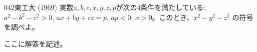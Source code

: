 \begin{thm}{042}{}{東工大 (1969)}
 実数$a,b,c,x,y,z,p$が次の4条件を満たしている: $a^2-b^2-c^2>0$, $ax+by+cz=p$, $ap<0$, $x>0$。このとき、$x^2-y^2-z^2$ の符号を調べよ。
\end{thm}

ここに解答を記述。